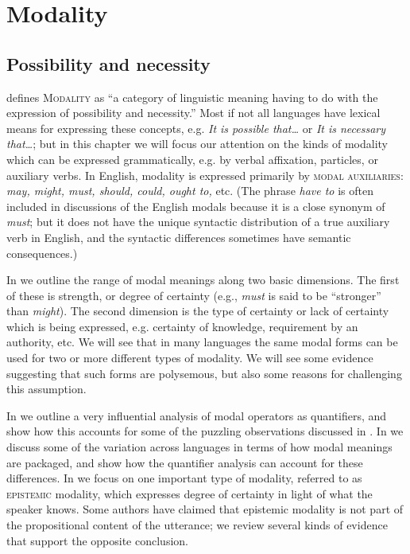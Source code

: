 \chapter{Modality}\label{sec:16}

\section{Possibility and necessity}\label{sec:16.1}

\citet{vonFintel2006} defines \textsc{Modality} as “a category of linguistic meaning having to do with the expression of possibility and necessity.” Most if not all languages have lexical means for expressing these concepts, e.g. \textit{It is possible that…} or \textit{It is necessary} \textit{that…}; but in this chapter we will focus our attention on the kinds of modality which can be expressed grammatically, e.g. by verbal affixation, particles, or auxiliary verbs. In English, modality is expressed primarily by \textsc{modal auxiliaries}: \textit{may, might, must, should, could, ought to,} etc. (The phrase \textit{have to} is often included in discussions of the English modals because it is a close synonym of \textit{must}; but it does not have the unique syntactic distribution of a true auxiliary verb in English, and the syntactic differences sometimes have semantic consequences.)



In  we outline the range of modal meanings along two basic dimensions. The first of these is strength, or degree of certainty (e.g., \textit{must} is said to be “stronger” than \textit{might}). The second dimension is the type of certainty or lack of certainty which is being expressed, e.g. certainty of knowledge, requirement by an authority, etc. We will see that in many languages the same modal forms can be used for two or more different types of modality. We will see some evidence suggesting that such forms are polysemous, but also some reasons for challenging this assumption.



In  we outline a very influential analysis of modal operators as quantifiers, and show how this accounts for some of the puzzling observations discussed in . In  we discuss some of the variation across languages in terms of how modal meanings are packaged, and show how the quantifier analysis can account for these differences. In  we focus on one important type of modality, referred to as \textsc{epistemic} modality, which expresses degree of certainty in light of what the speaker knows. Some authors have claimed that epistemic modality is not part of the propositional content of the utterance; we review several kinds of evidence that support the opposite conclusion.


